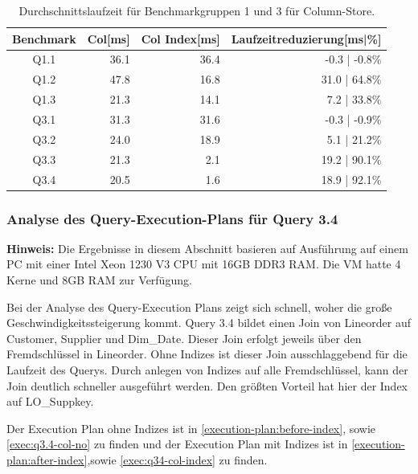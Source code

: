 \begin{table}[H]
    \centering
    \begin{tabularx}{\linewidth}{crrr}
        \toprule
        Benchmark           & Col[ms]       & Col Index[ms] & Laufzeitreduzierung[ms|\%]   \\
        \toprule
        Q1.1                & 36.1          & 36.4          & -0.3 | -0.8\%                \\
        Q1.2                & 47.8          & 16.8          & 31.0 | 64.8\%                 \\
        Q1.3                & 21.3          & 14.1          & 7.2 | 33.8\%                \\
        \midrule
        Q3.1                & 31.3          & 31.6          & -0.3 | -0.9\%                \\
        Q3.2                & 24.0          & 18.9          & 5.1 | 21.2\%                 \\
        Q3.3                & 21.3          & 2.1           & 19.2 | 90.1\%                \\
        Q3.4                & 20.5          & 1.6           & 18.9 | 92.1\%                \\
        \bottomrule
    \end{tabularx}
\caption{Durchschnittslaufzeit für Benchmarkgruppen 1 und 3 für Column-Store.}
\label{tab:q1_q3_col}
\end{table}

\subsubsection{Analyse des Query-Execution-Plans für Query 3.4}
\textbf{Hinweis:} Die Ergebnisse in diesem Abschnitt basieren auf Ausführung auf einem PC mit einer Intel Xeon 1230 V3 CPU mit 16GB DDR3 RAM. Die VM hatte 4 Kerne und 8GB RAM zur Verfügung.

Bei der Analyse des Query-Execution Plans zeigt sich schnell,
woher die große Geschwindigkeitssteigerung kommt.
Query 3.4 bildet einen Join von Lineorder auf Customer,
Supplier und Dim\_Date. 
Dieser Join erfolgt jeweils über den Fremdschlüssel in Lineorder.
Ohne Indizes ist dieser Join ausschlaggebend für die Laufzeit des Querys.
Durch anlegen von Indizes auf alle Fremdschlüssel,
kann der Join deutlich schneller ausgeführt werden.
Den größten Vorteil hat hier der Index auf LO\_Suppkey.

Der Execution Plan ohne Indizes ist in \autoref{execution-plan:before-index}, sowie \autoref{exec:q3.4-col-no}
zu finden und der Execution Plan mit Indizes ist in \autoref{execution-plan:after-index},sowie \autoref{exec:q34-col-index} zu finden.

